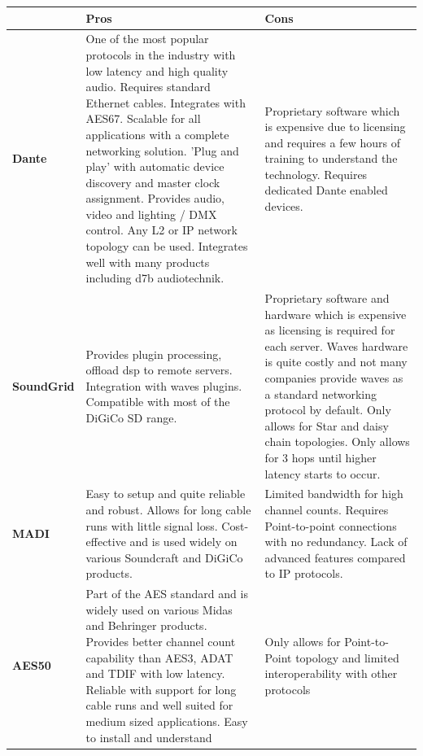             \begin{longtable}[H]{|p{2cm}|
                >{\columncolor[HTML]{9AFF99}}p{6.8cm} |
                >{\columncolor[HTML]{FFCCC9}}p{6.8cm} |}
                \hline
                 &
                  \textbf{Pros} &
                  \textbf{Cons} \\ \hline
                \endfirsthead
                \endhead
                \textbf{Dante} &
                  One of the most popular protocols in the industry with low latency and high quality audio. Requires standard Ethernet cables. Integrates with AES67. Scalable for all applications with a complete networking solution. 'Plug and play' with automatic device discovery and master clock assignment. Provides audio, video and lighting / DMX control. Any L2 or IP network topology can be used. Integrates well with many products including d7b audiotechnik. &
                  Proprietary software which is expensive due to licensing and requires a few hours of training to understand the technology. Requires dedicated Dante enabled devices. \\ \hline
                \textbf{SoundGrid} &
                  Provides plugin processing, offload \acrshort{dsp} to remote servers. Integration with waves plugins. Compatible with most of the DiGiCo SD range. &
                  Proprietary software and hardware which is expensive as licensing is required for each server. Waves hardware is quite costly and not many companies provide waves as a standard networking protocol by default. Only allows for Star and daisy chain topologies. Only allows for 3 hops until higher latency starts to occur. \\ \hline
                \textbf{MADI} &
                  Easy to setup and quite reliable and robust. Allows for long cable runs with little signal loss. Cost-effective and is used widely on various Soundcraft and DiGiCo products. &
                  Limited bandwidth for high channel counts. Requires Point-to-point connections with no redundancy. Lack of advanced features compared to IP protocols. \\ \hline
                \textbf{AES50} &
                  Part of the AES standard and is widely used on various Midas and Behringer products. Provides better channel count capability than AES3, ADAT and TDIF with low latency. Reliable with support for long cable runs and well suited for medium sized applications. Easy to install and understand &
                  Only allows for Point-to-Point topology and limited interoperability with other protocols \\ \hline

\end{longtable}
